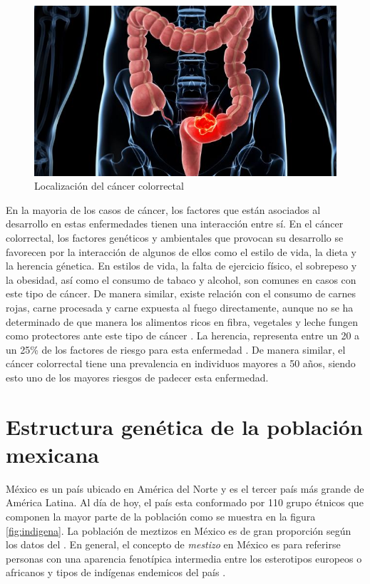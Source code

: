 \begin{figure}[H]
  \centering
  \includegraphics[scale=0.5]{cancer_colon.jpg}
  \caption[Localizaci\'on del c\'ancer colorrectal]{Localizaci\'on del c\'ancer colorrectal \cite{cancer}}
  \label{fig:cancer}
\end{figure}


En la mayoria de los casos de c\'ancer, los factores que est\'an asociados al desarrollo en estas enfermedades tienen una interacci\'on entre s\'i. En el c\'ancer colorrectal, los factores gen\'eticos y ambientales que provocan su desarrollo se favorecen por la interacci\'on de algunos de ellos como el estilo de vida, la dieta y la herencia g\'enetica. En estilos de vida, la falta de ejercicio f\'isico, el sobrepeso y la obesidad, as\'i como el consumo de tabaco y alcohol, son comunes en casos con este tipo de c\'ancer. De manera similar, existe relaci\'on con el consumo de carnes rojas, carne procesada y carne expuesta al fuego directamente, aunque no se ha determinado de que manera los alimentos ricos en fibra, vegetales y leche fungen como protectores ante este tipo de c\'ancer \cite{cancer}. La herencia, representa entre un 20 a un 25\% de los factores de riesgo para esta enfermedad \cite{Riestra}. De manera similar, el c\'ancer colorrectal tiene una prevalencia en individuos mayores a 50 años, siendo esto uno de los mayores riesgos de padecer esta enfermedad. \\



\section{Estructura gen\'etica de la poblaci\'on mexicana}

M\'exico es un pa\'is ubicado en Am\'erica del Norte  y es el tercer pa\'is m\'as grande de Am\'erica Latina. Al d\'ia de hoy, el pa\'is esta conformado por 110 grupo \'etnicos que componen la mayor parte de la poblaci\'on como se muestra en la figura \ref{fig:indigena}. La poblaci\'on de meztizos en M\'exico es de gran proporci\'on seg\'un los datos del \cite{INEGI}. En general, el concepto de \textit{mestizo} en M\'exico es para referirse  personas con una aparencia fenot\'ipica intermedia entre los esterotipos europeos o africanos y tipos de ind\'igenas endemicos del pa\'is \cite{estrada}. \\


